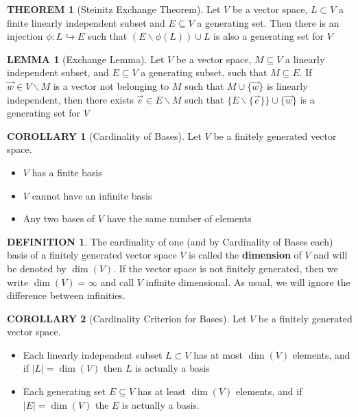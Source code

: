 \documentclass[12pt]{article}
\theoremstyle{definition}
\newtheorem{definition}{DEFINITION}[subsection]
\newtheorem{theorem}{THEOREM}[subsection]
\newtheorem{lemma}{LEMMA}[subsection]
\newtheorem{corollary}{COROLLARY}[subsection]
\begin{document}
\begin{theorem}[Steinitz Exchange Theorem]
    Let $V$ be a vector space, $L \subset V$ a finite linearly independent subset and $E \subseteq V$ a generating set. Then there is an injection $\phi: L \hookrightarrow E$ such that $(E \backslash \phi (L)) \cup L$ is also a generating set for $V$
\end{theorem}

\begin{lemma}[Exchange Lemma]
    Let $V$ be a vector space, $M \subseteq V$ a linearly independent subset, and $E \subseteq V$ a generating subset, such that $M \subseteq E$. If $\overrightarrow{w} \in V\backslash M$ is a vector not belonging to $M$ such that $M \cup \{\overrightarrow{w}\}$ is linearly independent, then there exists $\overrightarrow{e} \in E\backslash M$ such that $\{E\backslash\{\overrightarrow{e}\}\}\cup \{\overrightarrow{w}\}$ is a generating set for $V$
\end{lemma}

\begin{corollary}[Cardinality of Bases]
    Let $V$ be a finitely generated vector space.
    \begin{itemize}
        \item $V$ has a finite basis
        \item $V$ cannot have an infinite basis
        \item Any two bases of $V$ have the same number of elements
    \end{itemize}
\end{corollary}

\begin{definition}
    The cardinality of one (and by Cardinality of Bases each) basis of a finitely generated vector space $V$ is called the \textbf{dimension} of $V$ and will be denoted by $\dim(V)$. If the vector space is not finitely generated, then we write $\dim(V) = \infty$ and call $V$ infinite dimensional. As usual, we will ignore the difference between infinities.
\end{definition}

\begin{corollary}[Cardinality Criterion for Bases]
    Let $V$ be a finitely generated vector space.
    \begin{itemize}
        \item Each linearly independent subset $L \subset V$ has at most $\dim(V)$ elements, and if $|L|=\dim(V)$ then $L$ is actually a basis
        \item Each generating set $E \subseteq V$ has at least $\dim(V)$ elements, and if $|E| = \dim(V)$ the $E$ is actually a basis.
    \end{itemize}
\end{corollary}
\end{document}
